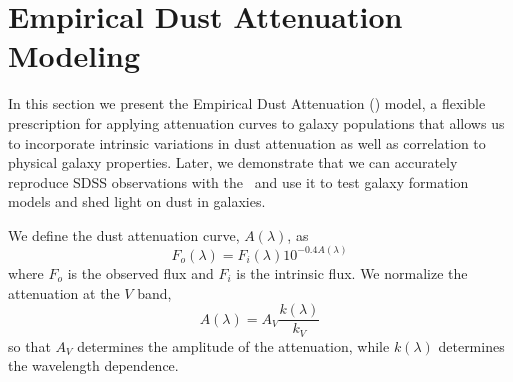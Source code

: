 \section{Empirical Dust Attenuation Modeling} \label{sec:dem}
In this section we present the Empirical Dust Attenuation (\eda) model, a
flexible prescription for applying attenuation curves to galaxy populations 
that allows us to incorporate intrinsic variations in dust attenuation as well
as correlation to physical galaxy properties. Later, we demonstrate that we can
accurately reproduce SDSS observations with the \eda~and use it to test galaxy
formation models and shed light on dust in galaxies. 

We define the dust attenuation curve, $A(\lambda)$, as 
\begin{equation} 
    F_o (\lambda) = F_i (\lambda) 10^{-0.4 A(\lambda)}
\end{equation}
where $F_o$ is the observed flux and $F_i$ is the intrinsic flux. We normalize
the attenuation at the $V$ band, 
\begin{equation} 
    A(\lambda) = A_V \frac{k(\lambda)}{k_V}
\end{equation}
so that $A_V$ determines the amplitude of the attenuation, while $k(\lambda)$
determines the wavelength dependence. 

